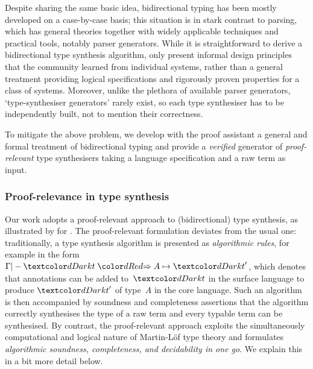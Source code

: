 
Despite sharing the same basic idea, bidirectional typing has been mostly developed on a case-by-case basis; this situation is in stark contrast to parsing, which has general theories together with widely applicable techniques and practical tools, notably parser generators.
While it is straightforward to derive a bidirectional type synthesis algorithm, \citeauthor{Dunfield2021} only present informal design principles that the community learned from individual systems, rather than a general treatment providing logical specifications and rigorously proven properties for a class of systems.
Moreover, unlike the plethora of available parser generators, `type-synthesiser generators' rarely exist, so each type synthesiser has to be independently built, not to mention their correctness.

To mitigate the above problem, we develop with the proof assistant \Agda a general and formal treatment of bidirectional typing and provide a \emph{verified} generator of \emph{proof-relevant} type synthesisers taking a language specification and a raw term as input.

\subsubsection{Proof-relevance in type synthesis}
\label{sec:PLFA}

Our work adopts a proof-relevant approach to (bidirectional) type synthesis, as illustrated by \citet{Wadler2022} for \PCF.
The proof-relevant formulation deviates from the usual one:
traditionally, a type synthesis algorithm is presented as \emph{algorithmic rules}, for example in the form $\Gamma |- \isTerm{t} \syn A \mapsto \isTerm{t}'$, which denotes that annotations can be added to~$\isTerm{t}$ in the surface language%
to produce $\isTerm{t}'$ of type~$A$ in the core language.
Such an algorithm is then accompanied by soundness and completeness assertions that the algorithm correctly synthesises the type of a raw term and every typable term can be synthesised.
By contrast, the proof-relevant approach exploits the simultaneously computational and logical nature of Martin-L\"of type theory and formulates \emph{algorithmic soundness, completeness, and decidability in one go}.
We explain this in a bit more detail below.

